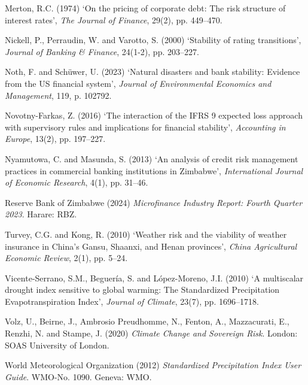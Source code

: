 \documentclass[12pt,a4paper]{article}
\begin{document}
\begin{description}[style=nextline, leftmargin=0pt, labelwidth=0pt, itemsep=0.5em]
\item Merton, R.C. (1974) `On the pricing of corporate debt: The risk structure of interest rates', \textit{The Journal of Finance}, 29(2), pp. 449--470.

\item Nickell, P., Perraudin, W. and Varotto, S. (2000) `Stability of rating transitions', \textit{Journal of Banking \& Finance}, 24(1-2), pp. 203--227.

\item Noth, F. and Sch\"uwer, U. (2023) `Natural disasters and bank stability: Evidence from the US financial system', \textit{Journal of Environmental Economics and Management}, 119, p. 102792.

\item Novotny-Farkas, Z. (2016) `The interaction of the IFRS 9 expected loss approach with supervisory rules and implications for financial stability', \textit{Accounting in Europe}, 13(2), pp. 197--227.

\item Nyamutowa, C. and Masunda, S. (2013) `An analysis of credit risk management practices in commercial banking institutions in Zimbabwe', \textit{International Journal of Economic Research}, 4(1), pp. 31--46.

\item Reserve Bank of Zimbabwe (2024) \textit{Microfinance Industry Report: Fourth Quarter 2023}. Harare: RBZ.

\item Turvey, C.G. and Kong, R. (2010) `Weather risk and the viability of weather insurance in China's Gansu, Shaanxi, and Henan provinces', \textit{China Agricultural Economic Review}, 2(1), pp. 5--24.

\item Vicente-Serrano, S.M., Beguer\'ia, S. and L\'opez-Moreno, J.I. (2010) `A multiscalar drought index sensitive to global warming: The Standardized Precipitation Evapotranspiration Index', \textit{Journal of Climate}, 23(7), pp. 1696--1718.

\item Volz, U., Beirne, J., Ambrosio Preudhomme, N., Fenton, A., Mazzacurati, E., Renzhi, N. and Stampe, J. (2020) \textit{Climate Change and Sovereign Risk}. London: SOAS University of London.

\item World Meteorological Organization (2012) \textit{Standardized Precipitation Index User Guide}. WMO-No. 1090. Geneva: WMO.

\end{description}
\end{document}
